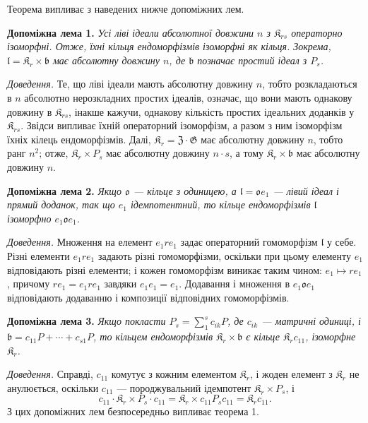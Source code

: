 \documentclass[11pt]{article}
\begin{document}
Теорема випливає з наведених нижче допоміжних лем.

\noindent\textbf{Допоміжна лема 1.} \emph{Усі ліві ідеали абсолютної довжини \(n\) з \(\mathfrak K_{rs}\) операторно ізоморфні. Отже, їхні кільця ендоморфізмів ізоморфні як кільця. Зокрема, \(\mathfrak l=\mathfrak K_r\times\mathfrak b\) має абсолютну довжину \(n\), де \(\mathfrak b\) позначає простий ідеал з \(P_s\).}

\noindent\emph{Доведення.} Те, що ліві ідеали мають абсолютну довжину \(n\), тобто розкладаються в \(n\) абсолютно нерозкладних простих ідеалів, означає, що вони мають однакову довжину в \(\mathfrak K_{rs}\), інакше кажучи, однакову кількість простих ідеальних доданків у \(\mathfrak K_{rs}\). Звідси випливає їхній операторний ізоморфізм, а разом з ним ізоморфізм їхніх кілець ендоморфізмів. Далі, \(\mathfrak K_r=\mathfrak Z\cdot\mathfrak G\) має абсолютну довжину \(n\), тобто ранг \(n^2\); отже, \(\mathfrak K_r\times P_s\) має абсолютну довжину \(n\cdot s\), а тому \(\mathfrak K_r\times\mathfrak b\) має абсолютну довжину \(n\).

\noindent\textbf{Допоміжна лема 2.} \emph{Якщо \(\mathfrak o\) --- кільце з одиницею, а \(\mathfrak l=\mathfrak o e_1\) --- лівий ідеал і прямий доданок, так що \(e_1\) ідемпотентний, то кільце ендоморфізмів \(\mathfrak l\) ізоморфно \(e_1\mathfrak o e_1\).}

\noindent\emph{Доведення.} Множення на елемент \(e_1re_1\) задає операторний гомоморфізм \(\mathfrak l\) у себе. Різні елементи \(e_1re_1\) задають різні гомоморфізми, оскільки при цьому елементу \(e_1\) відповідають різні елементи; і кожен гомоморфізм виникає таким чином: \(e_1\mapsto re_1\), причому \(re_1=e_1re_1\) завдяки \(e_1e_1=e_1\). Додавання і множення в \(e_1\mathfrak o e_1\) відповідають додаванню і композиції відповідних гомоморфізмів.

\noindent\textbf{Допоміжна лема 3.} \emph{Якщо покласти \(P_s=\sum_1^s c_{ik}P\), де \(c_{ik}\) --- матричні одиниці, і \(\mathfrak b=c_{11}P+\cdots+c_{s1}P\), то кільцем ендоморфізмів \(\mathfrak K_r\times\mathfrak b\) є кільце \(\mathfrak K_rc_{11}\), ізоморфне \(\mathfrak K_r\).}

\noindent\emph{Доведення.} Справді, \(c_{11}\) комутує з кожним елементом \(\mathfrak K_r\), і жоден елемент з \(\mathfrak K_r\) не анулюється, оскільки \(c_{11}\) --- породжувальний ідемпотент \(\mathfrak K_r\times P_s\), і
\[
c_{11}\cdot\mathfrak K_r\times P_s\cdot c_{11}
=\mathfrak K_r\times c_{11}P_sc_{11}
=\mathfrak K_rc_{11}.
\]
З цих допоміжних лем безпосередньо випливає теорема 1.
\end{document}
